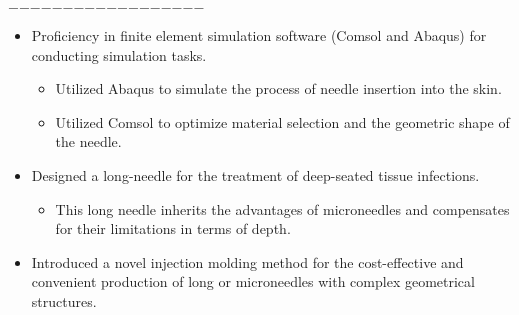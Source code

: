 \documentclass{resume}
\begin{document}
    \noindent\hfil$-$\hfil$-$\hfil$-$\hfil$-$\hfil$-$\hfil$-$\hfil$-$\hfil$-$\hfil$-$\hfil$-$\hfil$-$\hfil$-$\hfil$-$\hfil$-$\hfil$-$\hfil$-$\hfil$-$\hfil$-$\hfil

    \begin{itemize}
      \item Proficiency in finite element simulation software (Comsol and Abaqus) for conducting simulation tasks.  \begin{itemize}
        \item Utilized Abaqus to simulate the process of needle insertion into the skin.
        \item Utilized Comsol to optimize material selection and the geometric shape of the needle.
      \end{itemize}
      \item Designed a long-needle for the treatment of deep-seated tissue infections.  
        \begin{itemize}
          \item This long needle inherits the advantages of microneedles and compensates for their limitations in terms of depth.
        \end{itemize}
      \item Introduced a novel injection molding method for the cost-effective and convenient production of long or microneedles with complex geometrical structures. 
    \end{itemize}
\end{document}
